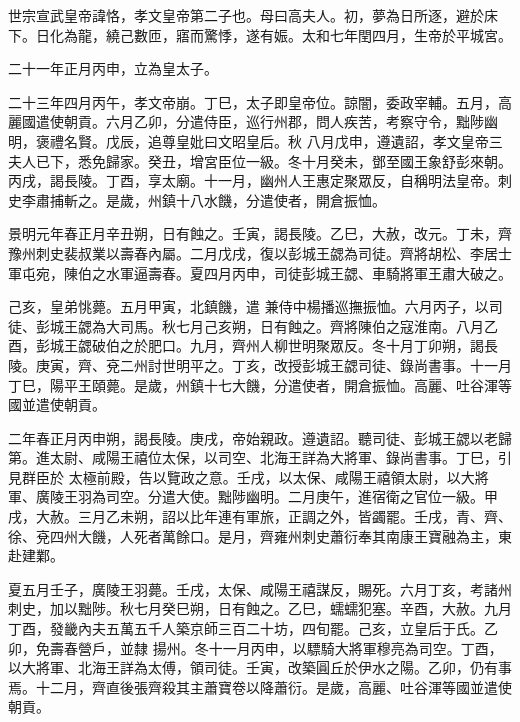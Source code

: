 
\begin{pinyinscope}

 世宗宣武皇帝諱恪，孝文皇帝第二子也。母曰高夫人。初，夢為日所逐，避於床下。日化為龍，繞己數匝，寤而驚悸，遂有娠。太和七年閏四月，生帝於平城宮。



 二十一年正月丙申，立為皇太子。



 二十三年四月丙午，孝文帝崩。丁巳，太子即皇帝位。諒闇，委政宰輔。五月，高麗國遣使朝貢。六月乙卯，分遣侍臣，巡行州郡，問人疾苦，考察守令，黜陟幽明，褒禮名賢。戊辰，追尊皇妣曰文昭皇后。秋
 八月戊申，遵遺詔，孝文皇帝三夫人已下，悉免歸家。癸丑，增宮臣位一級。冬十月癸未，鄧至國王象舒彭來朝。丙戌，謁長陵。丁酉，享太廟。十一月，幽州人王惠定聚眾反，自稱明法皇帝。刺史李肅捕斬之。是歲，州鎮十八水饑，分遣使者，開倉振恤。



 景明元年春正月辛丑朔，日有蝕之。壬寅，謁長陵。乙巳，大赦，改元。丁未，齊豫州刺史裴叔業以壽春內屬。二月戊戌，復以彭城王勰為司徒。齊將胡松、李居士軍屯宛，陳伯之水軍逼壽春。夏四月丙申，司徒彭城王勰、車騎將軍王肅大破之。



 己亥，皇弟恌薨。五月甲寅，北鎮饑，遣
 兼侍中楊播巡撫振恤。六月丙子，以司徒、彭城王勰為大司馬。秋七月己亥朔，日有蝕之。齊將陳伯之寇淮南。八月乙酉，彭城王勰破伯之於肥口。九月，齊州人柳世明聚眾反。冬十月丁卯朔，謁長陵。庚寅，齊、兗二州討世明平之。丁亥，改授彭城王勰司徒、錄尚書事。十一月丁巳，陽平王頤薨。是歲，州鎮十七大饑，分遣使者，開倉振恤。高麗、吐谷渾等國並遣使朝貢。



 二年春正月丙申朔，謁長陵。庚戌，帝始親政。遵遺詔。聽司徒、彭城王勰以老歸第。進太尉、咸陽王禧位太保，以司空、北海王詳為大將軍、錄尚書事。丁巳，引見群臣於
 太極前殿，告以覽政之意。壬戌，以太保、咸陽王禧領太尉，以大將軍、廣陵王羽為司空。分遣大使。黜陟幽明。二月庚午，進宿衛之官位一級。甲戌，大赦。三月乙未朔，詔以比年連有軍旅，正調之外，皆蠲罷。壬戌，青、齊、徐、兗四州大饑，人死者萬餘口。是月，齊雍州刺史蕭衍奉其南康王寶融為主，東赴建鄴。



 夏五月壬子，廣陵王羽薨。壬戌，太保、咸陽王禧謀反，賜死。六月丁亥，考諸州刺史，加以黜陟。秋七月癸巳朔，日有蝕之。乙巳，蠕蠕犯塞。辛酉，大赦。九月丁酉，發畿內夫五萬五千人築京師三百二十坊，四旬罷。己亥，立皇后于氏。乙卯，免壽春營戶，並隸
 揚州。冬十一月丙申，以驃騎大將軍穆亮為司空。丁酉，以大將軍、北海王詳為太傅，領司徒。壬寅，改築圓丘於伊水之陽。乙卯，仍有事焉。十二月，齊直後張齊殺其主蕭寶卷以降蕭衍。是歲，高麗、吐谷渾等國並遣使朝貢。




\end{pinyinscope}
